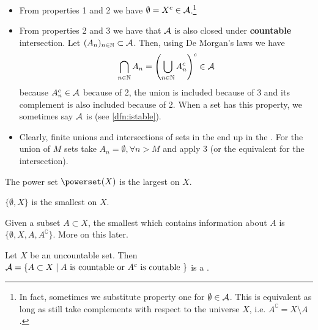 \begin{remark}$ $ \newline
	\begin{itemize}
		\item From properties 1 and 2 we have $\emptyset = X^c\in \mathcal{A}$.\footnote{In fact, sometimes we substitute property one for $\emptyset \in \mathcal{A}$. This is equivalent as long as still take complements with respect to the universe $X$, i.e. $A^\complement = X \setminus A$.}
		\item From properties 2 and 3 we have that $\mathcal{A}$ is also closed under \textbf{countable} intersection. Let $(A_n)_{n \in \mathbb{N}} \subset \mathcal{A}$. Then, using De Morgan's laws we have
		\begin{align*}
			\bigcap_{n \in \mathbb{N}} A_n = \left(\bigcup_{n \in \mathbb{N}} A_n^c\right)^c \in \mathcal{A}
		\end{align*}
		because $A_n^c \in \mathcal{A}$ because of 2, the union is included because of 3 and its complement is also included because of 2. When a set has this property, we sometimes say $\mathcal{A}$ is \istable (see \autoref{dfn:istable}).
		\item Clearly, finite unions and intersections of sets in the \siga end up in the \siga. For the union of $M$ sets take $A_n = \emptyset, \forall n > M$ and apply 3 (or the equivalent for the intersection).
	\end{itemize}
\end{remark}

\begin{eg}
	The power set $\powerset (X)$ is the largest \siga on $X$.
\end{eg}

\begin{eg}
	$\{\emptyset, X\}$ is the smallest \siga on $X$.
\end{eg}
		
\begin{eg}
	Given a subset $A \subset X$, the smallest \siga which contains information about $A$ is $\{\emptyset, X, A, A^\complement\}$. More on this later.
	
	
	Let $X$ be an uncountable set. Then $\mathcal{A} = \{ A \subset X \mid A \text{ is countable or } A^c \text{ is coutable }\}$ is a \siga.
\end{eg}

